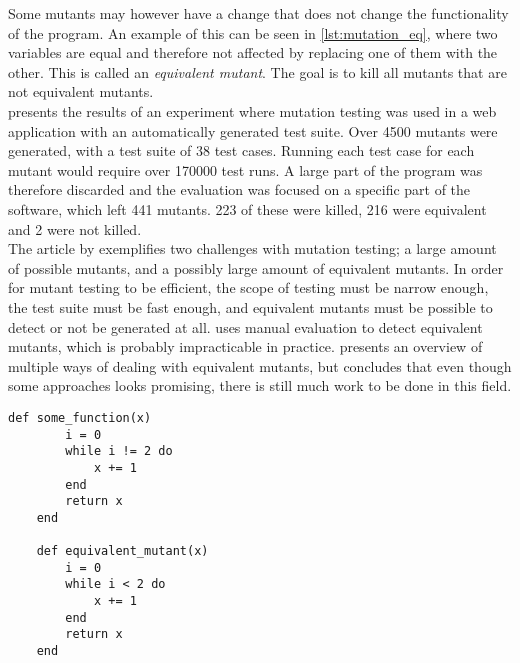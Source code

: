 Some mutants may however have a change that does not change the
functionality of the program. An example of this can be seen in
\ref{lst:mutation_eq}, where two variables are equal and therefore not
affected by replacing one of them with the other. This is called an
\emph{equivalent mutant}. The goal is to kill all mutants that are not
equivalent mutants. \cite{article:mutation, wiki:mutation}\\

\citet{article:mutation} presents the results of an experiment where
mutation testing was used in a web application with an automatically
generated test suite. Over 4500 mutants were generated, with a test suite
of 38 test cases. Running each test case for each mutant would require
over 170000 test runs. A large part of the program was therefore
discarded and the evaluation was focused on a specific part of the
software, which left 441 mutants. 223 of these were killed, 216 were
equivalent and 2 were not killed.\\

The article by \citeauthor{article:mutation} exemplifies two challenges
with mutation testing; a large amount of possible mutants, and a
possibly large amount of equivalent mutants. In order for mutant testing
to be efficient, the scope of testing must be narrow enough, the test
suite must be fast enough, and equivalent mutants must be possible to
detect or not be generated at all. \citeauthor{article:mutation} uses
manual evaluation to detect equivalent mutants, which is probably
impracticable in practice. \citet{article:eq_mutant} presents an
overview of multiple ways of dealing with equivalent mutants, but
concludes that even though some approaches looks promising, there is
still much work to be done in this field.\\

\begin{lstlisting}[caption=Example of a program with an equivalent mutant.,
                   label=lst:mutation_eq, float=t]
    def some_function(x)
        i = 0
        while i != 2 do
            x += 1
        end
        return x
    end

    def equivalent_mutant(x)
        i = 0
        while i < 2 do
            x += 1
        end
        return x
    end
\end{lstlisting}

